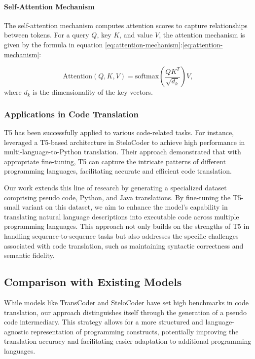 \documentclass{dhbenelux}
\begin{document}
\paragraph{Self-Attention Mechanism}
The self-attention mechanism \cite{cheng2016longshorttermmemorynetworksmachine} computes attention scores to capture relationships between tokens. For a query \(Q\), key \(K\), and value \(V\), the attention mechanism is given by the formula in equation \ref{eq:attention-mechanism}:\ref{eq:attention-mechanism}:

\begin{equation}
\text{Attention}(Q, K, V) = \text{softmax}\left(\frac{QK^T}{\sqrt{d_k}}\right)V,
\label{eq:attention-mechanism}
\end{equation}
where \(d_k\) is the dimensionality of the key vectors.

\subsubsection{Applications in Code Translation}

T5 has been successfully applied to various code-related tasks. For instance, \cite{pan2023} leveraged a T5-based architecture in SteloCoder to achieve high performance in multi-language-to-Python translation. Their approach demonstrated that with appropriate fine-tuning, T5 can capture the intricate patterns of different programming languages, facilitating accurate and efficient code translation.

Our work extends this line of research by generating a specialized dataset comprising pseudo code, Python, and Java translations. By fine-tuning the T5-small variant on this dataset, we aim to enhance the model's capability in translating natural language descriptions into executable code across multiple programming languages. This approach not only builds on the strengths of T5 in handling sequence-to-sequence tasks but also addresses the specific challenges associated with code translation, such as maintaining syntactic correctness and semantic fidelity.

\subsection{Comparison with Existing Models}

While models like TransCoder and SteloCoder have set high benchmarks in code translation, our approach distinguishes itself through the generation of a pseudo code intermediary. This strategy allows for a more structured and language-agnostic representation of programming constructs, potentially improving the translation accuracy and facilitating easier adaptation to additional programming languages.
\end{document}
